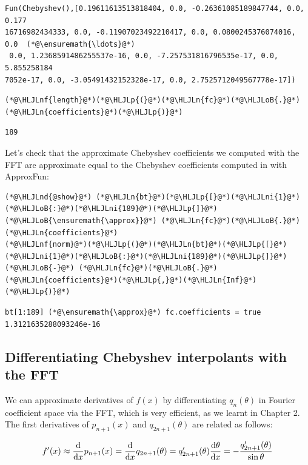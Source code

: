 \documentclass[12pt,a4paper]{article}
\newcommand{\HLJLn}[1]{#1}
\newcommand{\HLJLnd}[1]{\textcolor[RGB]{214,102,97}{#1}}
\newcommand{\HLJLnf}[1]{\textcolor[RGB]{66,102,213}{#1}}
\newcommand{\HLJLni}[1]{\textcolor[RGB]{59,151,46}{#1}}
\newcommand{\HLJLoB}[1]{\textcolor[RGB]{102,102,102}{\textbf{#1}}}
\newcommand{\HLJLp}[1]{#1}
\begin{document}
\begin{lstlisting}
Fun(Chebyshev(),[0.19611613513818404, 0.0, -0.26361085189847744, 0.0, 0.177
16716982434333, 0.0, -0.11907023492210417, 0.0, 0.0800245376074016, 0.0  (*@\ensuremath{\ldots}@*) 
 0.0, 1.2368591486255537e-16, 0.0, -7.257531816796535e-17, 0.0, 5.855258184
7052e-17, 0.0, -3.05491432152328e-17, 0.0, 2.7525712049567778e-17])
\end{lstlisting}


\begin{lstlisting}
(*@\HLJLnf{length}@*)(*@\HLJLp{(}@*)(*@\HLJLn{fc}@*)(*@\HLJLoB{.}@*)(*@\HLJLn{coefficients}@*)(*@\HLJLp{)}@*)
\end{lstlisting}

\begin{lstlisting}
189
\end{lstlisting}


Let's check that the approximate Chebyshev coefficients we computed with the FFT are approximate equal to the Chebyshev coefficients computed in with ApproxFun:


\begin{lstlisting}
(*@\HLJLnd{@show}@*) (*@\HLJLn{bt}@*)(*@\HLJLp{[}@*)(*@\HLJLni{1}@*)(*@\HLJLoB{:}@*)(*@\HLJLni{189}@*)(*@\HLJLp{]}@*) (*@\HLJLoB{\ensuremath{\approx}}@*) (*@\HLJLn{fc}@*)(*@\HLJLoB{.}@*)(*@\HLJLn{coefficients}@*)
(*@\HLJLnf{norm}@*)(*@\HLJLp{(}@*)(*@\HLJLn{bt}@*)(*@\HLJLp{[}@*)(*@\HLJLni{1}@*)(*@\HLJLoB{:}@*)(*@\HLJLni{189}@*)(*@\HLJLp{]}@*) (*@\HLJLoB{-}@*) (*@\HLJLn{fc}@*)(*@\HLJLoB{.}@*)(*@\HLJLn{coefficients}@*)(*@\HLJLp{,}@*)(*@\HLJLn{Inf}@*)(*@\HLJLp{)}@*)
\end{lstlisting}

\begin{lstlisting}
bt[1:189] (*@\ensuremath{\approx}@*) fc.coefficients = true
1.3121635288093246e-16
\end{lstlisting}


\subsection{Differentiating Chebyshev interpolants with the FFT}
We can approximate derivatives of $f(x)$ by differentiating $q_n(\theta)$ in Fourier coefficient space via the FFT, which is very efficient, as we learnt in Chapter 2. The first derivatives of $p_{n+1}(x)$ and $q_{2n+1}(\theta)$ are related as follows:

\[
f'(x) \approx \frac{{\rm d}}{{\rm d}x}p_{n+1}(x) = \frac{{\rm d}}{{\rm d}x}q_{2n+1}(\theta) = q_{2n+1}'(\theta)\frac{{\rm d} \theta}{\mathrm{d}x} = -\frac{q_{2n+1}'(\theta)}{\sin \theta}
\]
\end{document}
